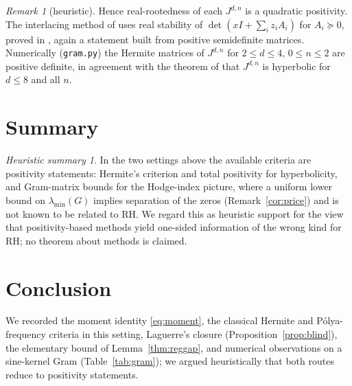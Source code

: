 \documentclass[11pt]{amsart}
\theoremstyle{definition}
\theoremstyle{remark}
\newtheorem{remark}[theorem]{Remark}
\newtheorem*{thesis}{Heuristic summary}
\begin{document}
\begin{remark}[heuristic]
Hence real-rootedness of each $J^{d,n}$ is a quadratic positivity. The interlacing method of
\cite{MSS1,MSS} uses real stability of $\det(xI+\sum_iz_iA_i)$ for $A_i\succeq0$, proved in \cite{BB2},
again a statement built from positive semidefinite matrices. Numerically (\texttt{gram.py}) the Hermite matrices of
$J^{d,n}$ for $2\le d\le4$, $0\le n\le2$ are positive definite, in agreement with the theorem of
\cite{GORZ} that $J^{d,n}$ is hyperbolic for $d\le8$ and all $n$.
\end{remark}

\section{Summary}\label{sec:capstone}

\begin{thesis}
In the two settings above the available criteria are positivity statements: Hermite's criterion and total
positivity for hyperbolicity, and Gram-matrix bounds for the Hodge-index picture, where a uniform lower bound on
$\lambda_{\min}(G)$ implies separation of the zeros (Remark~\ref{cor:price}) and is not known to be related to RH. We regard this as
heuristic support for the view that positivity-based methods yield one-sided information of the wrong kind
for RH; no theorem about methods is claimed.
\end{thesis}

\section{Conclusion}\label{sec:concl}
We recorded the moment identity \eqref{eq:moment}, the classical Hermite and Pólya-frequency criteria in this
setting, Laguerre's closure (Proposition~\ref{prop:blind}), the elementary bound of Lemma~\ref{thm:reggap}, and numerical observations on a
sine-kernel Gram (Table~\ref{tab:gram}); we argued heuristically that both routes reduce to positivity statements.
\end{document}

